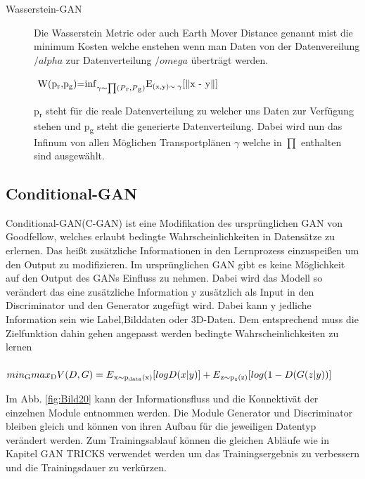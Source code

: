 \documentclass{llncs}
\begin{document}
\begin{description}
\item[Wasserstein-GAN]

Die Wasserstein Metric oder auch Earth Mover Distance genannt mist die minimum Kosten welche enstehen wenn man Daten von der Datenvereilung $/alpha$ zur Datenverteilung $/omega$ überträgt werden.



\begin{math} 
$
W(p\textsubscript{r},p\textsubscript{g})=$\inf_{\gamma\sim\prod(P\textsubscript{r},P\textsubscript{g})}$E\textsubscript{(x,y)$\sim\gamma$}[$\parallel$x - y$\parallel$]
$
\end{math}

p\textsubscript{r} steht für die reale Datenverteilung zu welcher uns Daten zur Verfügung stehen und p\textsubscript{g} steht die generierte Datenverteilung. Dabei wird nun das Infinum von allen Möglichen Transportplänen $\gamma$ welche in $\prod$ enthalten sind ausgewählt. 


\end{description}
\newpage



\subsection{Conditional-GAN}

Conditional-GAN(C-GAN) ist eine Modifikation des ursprünglichen GAN von Goodfellow, welches erlaubt bedingte Wahrscheinlichkeiten in Datensätze zu erlernen. Das heißt zusätzliche Informationen in den Lernprozess einzuspeißen um den Output zu modifizieren. Im ursprünglichen GAN gibt es keine Möglichkeit auf den Output des GANs Einfluss zu nehmen. Dabei wird das Modell so verändert das eine zusätzliche Information y zusätzlich als Input in den Discriminator und den Generator zugefügt wird. Dabei kann y jedliche Information sein wie Label,Bilddaten oder 3D-Daten. Dem entsprechend muss die Zielfunktion dahin gehen angepasst werden bedingte Wahrscheinlichkeiten zu lernen
\\\\
\begin{math}
min\textsubscript{G} max\textsubscript{D}V(D,G)=E\textsubscript{x$\sim$p\textsubscript{data}(x)}[logD(x|y)]  + E\textsubscript{z$\sim$p\textsubscript{z}(z)}[log(1-D(G(z|y))]
\\\\             
\end{math}

Im Abb. \ref{fig:Bild20} kann der Informationsfluss und die Konnektivät der einzelnen Module entnommen werden. Die Module Generator und Discriminator bleiben gleich und können von ihren Aufbau für die jeweiligen Datentyp verändert werden. Zum Trainingsablauf können die gleichen Abläufe wie in Kapitel GAN TRICKS verwendet werden um das Trainingsergebnis zu verbessern und die Trainingsdauer zu verkürzen. 
\end{document}
